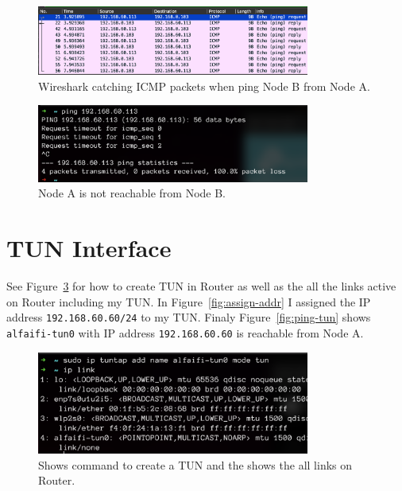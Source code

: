 \documentclass{article}
\def\c#1{\texttt{#1}}
\begin{document}
\begin{figure}[!hb]
	\centering
	\includegraphics[width=0.8\textwidth]{figures/ping-b-wire}
	\caption{Wireshark catching ICMP packets when ping Node B from Node A.}
	\label{fig:ping-node-b-wire}
\end{figure}

\begin{figure}[!hb]
	\centering
	\includegraphics[width=0.8\textwidth]{figures/not-reach}
	\caption{Node A is not reachable from Node B.}
	\label{fig:not-reach}
\end{figure}

\section{TUN Interface} %
\label{sec:TUN Interface}
See Figure~\ref{fig:create-tun} for how to create TUN in Router as well as the
all the links active on Router including my TUN. In Figure~\ref{fig:assign-addr} I assigned
the IP address \c{192.168.60.60/24} to my TUN. Finaly Figure~\ref{fig:ping-tun} shows
\c{alfaifi-tun0} with IP address \c{192.168.60.60} is reachable from Node A.

\begin{figure}[!hb]
	\centering
	\includegraphics[width=0.8\textwidth]{./figures/create-tun.png}
	\caption{Shows command to create a TUN and the shows the all links on Router.}
	\label{fig:create-tun}
\end{figure}
\end{document}
